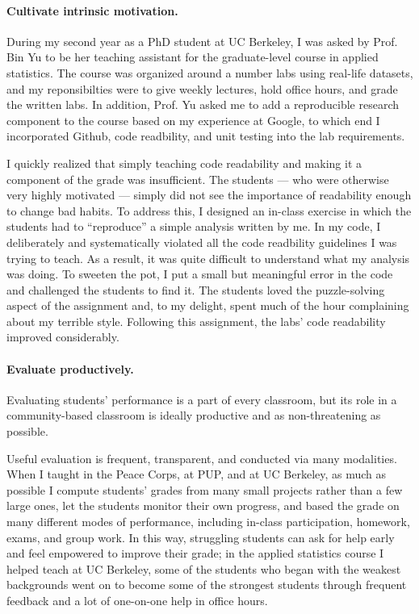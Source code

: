 \paragraph{Cultivate intrinsic motivation.}
%
During my second year as a PhD student at UC Berkeley, I was asked by Prof. Bin
Yu to be her teaching assistant for the graduate-level course in applied
statistics.  The course was organized around a number labs using real-life
datasets, and my reponsibilties were to give weekly lectures, hold office hours,
and grade the written labs.  In addition, Prof. Yu asked me to add a
reproducible research component to the course based on my experience at Google,
to which end I incorporated Github, code readbility, and unit testing into the
lab requirements.

I quickly realized that simply teaching code readability and making it a
component of the grade was insufficient.   The students --- who were otherwise
very highly motivated --- simply did not see the importance of readability
enough to change bad habits.  To address this, I designed an in-class exercise
in which the students had to ``reproduce'' a simple analysis written by me.  In
my code, I deliberately and systematically violated all the code readbility
guidelines I was trying to teach.  As a result, it was quite difficult to
understand what my analysis was doing.  To sweeten the pot, I put a small but
meaningful error in the code and challenged the students to find it.  The
students loved the puzzle-solving aspect of the assignment and, to my delight,
spent much of the hour complaining about my terrible style.  Following this
assignment, the labs' code readability improved considerably.


\paragraph{Evaluate productively.}

Evaluating students' performance is a part of every classroom, but its role in a
community-based classroom is ideally productive and as non-threatening as
possible.

Useful evaluation is frequent, transparent, and conducted via many modalities.
When I taught in the Peace Corps, at PUP, and at UC Berkeley, as much as
possible I compute students' grades from many small projects rather than a few
large ones, let the students monitor their own progress, and based the grade on
many different modes of performance, including in-class participation, homework,
exams, and group work.  In this way, struggling students can ask for help early
and feel empowered to improve their grade; in the applied statistics course I
helped teach at UC Berkeley, some of the students who began with the weakest
backgrounds went on to become some of the strongest students through frequent
feedback and a lot of one-on-one help in office hours.

